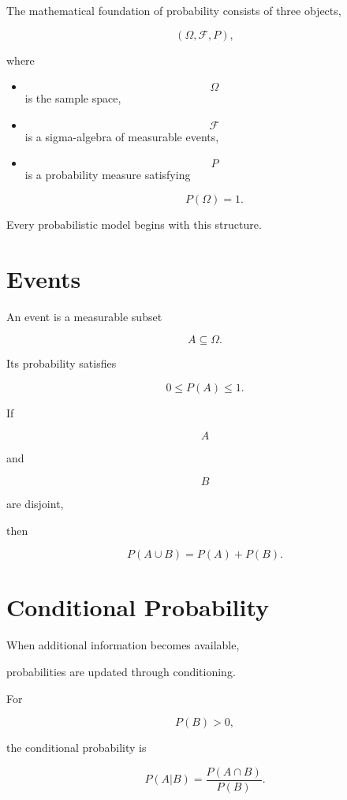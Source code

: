 \documentclass[11pt,fleqn]{book}
\numberwithin{equation}{chapter}
\theoremstyle{plain}
\theoremstyle{definition}
\theoremstyle{remark}
\begin{document}
The mathematical foundation of probability consists of three objects,

\[
(\Omega,\mathcal F,P),
\]

where

\begin{itemize}
\item
\[
\Omega
\]
is the sample space,

\item
\[
\mathcal F
\]
is a sigma-algebra of measurable events,

\item
\[
P
\]
is a probability measure satisfying

\[
P(\Omega)=1.
\]
\end{itemize}

Every probabilistic model begins with this structure.


\section{Events}

An event is a measurable subset

\[
A\subseteq\Omega.
\]

Its probability satisfies

\[
0
\le
P(A)
\le
1.
\]

If

\[
A
\]

and

\[
B
\]

are disjoint,

then

\[
\boxed{
P(A\cup B)
=
P(A)+P(B).
}
\]


\section{Conditional Probability}

When additional information becomes available,

probabilities are updated through conditioning.

For

\[
P(B)>0,
\]

the conditional probability is

\[
\boxed{
P(A|B)
=
\frac{P(A\cap B)}
{P(B)}.
}
\]
\end{document}
